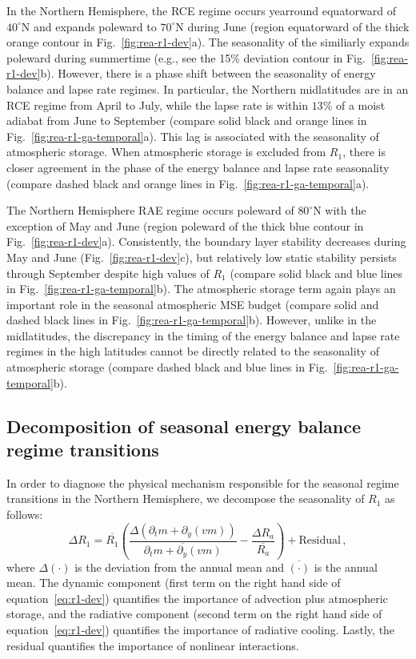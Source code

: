 \documentclass{ametsocV5}
\begin{document}
    In the Northern Hemisphere, the RCE regime occurs yearround equatorward of $40^\circ$N and expands poleward to $70^\circ$N during June (region equatorward of the thick orange contour in Fig.~\ref{fig:rea-r1-dev}a). The seasonality of the  similiarly expands poleward during summertime (e.g., see the 15\% deviation contour in Fig.~\ref{fig:rea-r1-dev}b). However, there is a phase shift between the seasonality of energy balance and lapse rate regimes. In particular, the Northern midlatitudes are in an RCE regime from April to July, while the lapse rate is within $13$\% of a moist adiabat from June to September (compare solid black and orange lines in Fig.~\ref{fig:rea-r1-ga-temporal}a). This lag is associated with the seasonality of atmospheric storage. When atmospheric storage is excluded from $R_1$, there is closer agreement in the phase of the energy balance and lapse rate seasonality (compare dashed black and orange lines in Fig.~\ref{fig:rea-r1-ga-temporal}a).

    The Northern Hemisphere RAE regime occurs poleward of $80^\circ$N with the exception of May and June (region poleward of the thick blue contour in Fig.~\ref{fig:rea-r1-dev}a). Consistently, the boundary layer stability decreases during May and June (Fig.~\ref{fig:rea-r1-dev}c), but relatively low static stability persists through September despite high values of $R_1$ (compare solid black and blue lines in Fig.~\ref{fig:rea-r1-ga-temporal}b). The atmospheric storage term again plays an important role in the seasonal atmospheric MSE budget (compare solid and dashed black lines in Fig.~\ref{fig:rea-r1-ga-temporal}b). However, unlike in the midlatitudes, the discrepancy in the timing of the energy balance and lapse rate regimes in the high latitudes cannot be directly related to the seasonality of atmospheric storage (compare dashed black and blue lines in Fig.~\ref{fig:rea-r1-ga-temporal}b).

    \subsection{Decomposition of seasonal energy balance regime transitions}
    In order to diagnose the physical mechanism responsible for the seasonal regime transitions in the Northern Hemisphere, we decompose the seasonality of $R_1$ as follows:
    \begin{equation}\label{eq:r1-dev}
      \Delta R_1 = \overline{R_1}\left( \frac{\Delta(\partial_t m + \partial_y (vm))}{\overline{\partial_t m + \partial_y (vm)}}  - \frac{\Delta R_a }{\overline{R_a}}\right) + \mathrm{Residual} \, ,
    \end{equation}
    where $\Delta(\cdot)$ is the deviation from the annual mean and $\overline{(\cdot)}$ is the annual mean. The dynamic component (first term on the right hand side of equation~\ref{eq:r1-dev}) quantifies the importance of advection plus atmospheric storage, and the radiative component (second term on the right hand side of equation~\ref{eq:r1-dev}) quantifies the importance of radiative cooling. Lastly, the residual quantifies the importance of nonlinear interactions.
\end{document}
